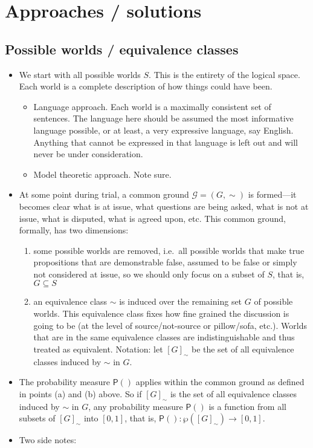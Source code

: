 \documentclass[
  11pt,
  dvipsnames,enabledeprecatedfontcommands]{scrartcl}
\providecommand{\tightlist}{%
  \setlength{\itemsep}{0pt}\setlength{\parskip}{0pt}}
\newcommand{\pr}[1]{\ensuremath{\mathsf{P}(#1)}}
\begin{document}
\hypertarget{approaches-solutions}{%
\section{Approaches / solutions}\label{approaches-solutions}}

\hypertarget{possible-worlds-equivalence-classes}{%
\subsection{Possible worlds / equivalence
classes}\label{possible-worlds-equivalence-classes}}

\begin{itemize}
\item
  We start with all possible worlds \(S\). This is the entirety of the
  logical space. Each world is a complete description of how things
  could have been.

  \begin{itemize}
  \tightlist
  \item
    Language approach. Each world is a maximally consistent set of
    sentences. The language here should be assumed the most informative
    language possible, or at least, a very expressive language, say
    English. Anything that cannot be expressed in that language is left
    out and will never be under consideration.
  \item
    Model theoretic approach. Note sure.
  \end{itemize}
\item
  At some point during trial, a common ground \(\mathcal{G}=(G, \sim)\)
  is formed---it becomes clear what is at issue, what questions are
  being asked, what is not at issue, what is disputed, what is agreed
  upon, etc. This common ground, formally, has two dimensions:

  \begin{enumerate}
  \def\labelenumi{\alph{enumi}.}
  \tightlist
  \item
    some possible worlds are removed, i.e.~all possible worlds that make
    true propositions that are demonstrable false, assumed to be false
    or simply not considered at issue, so we should only focus on a
    subset of \(S\), that is, \(G\subseteq S\)
  \item
    an equivalence class \(\sim\) is induced over the remaining set
    \(G\) of possible worlds. This equivalence class fixes how fine
    grained the discussion is going to be (at the level of
    source/not-source or pillow/sofa, etc.). Worlds that are in the same
    equivalence classes are indistinguishable and thus treated as
    equivalent. Notation: let \([G]_\sim\) be the set of all equivalence
    classes induced by \(\sim\) in \(G\).
  \end{enumerate}
\item
  The probability measure \(\pr{}\) applies within the common ground as
  defined in points (a) and (b) above. So if \([G]_\sim\) is the set of
  all equivalence classes induced by \(\sim\) in \(G\), any probability
  measure \(\pr{}\) is a function from all subsets of \([G]_\sim\) into
  \([0, 1]\), that is, \(\pr{}: \wp([G]_\sim)\to [0,1]\).
\item
  Two side notes:


\end{itemize}
\end{document}
